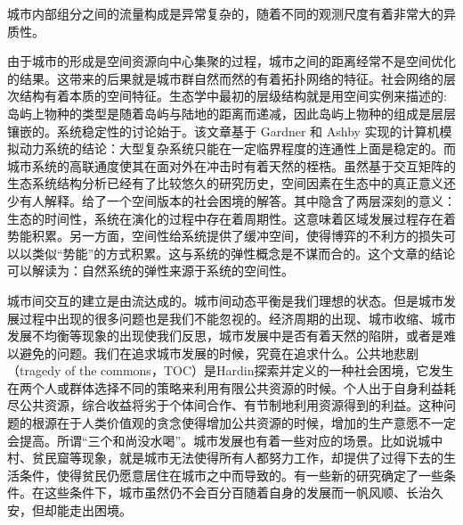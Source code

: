 
城市内部组分之间的流量构成是异常复杂的，随着不同的观测尺度有着非常大的异质性\cite{masucci2013gravity}。


由于城市的形成是空间资源向中心集聚的过程，城市之间的距离经常不是空间优化的结果。这带来的后果就是城市群自然而然的有着拓扑网络的特征。社会网络的层次结构有着本质的空间特征。生态学中最初的层级结构就是用空间实例来描述的:岛屿上物种的类型是随着岛屿与陆地的距离而递减，因此岛屿上物种的组成是层层镶嵌的。系统稳定性的讨论始于\cite{may1972will}。该文章基于 Gardner 和 Ashby 实现的计算机模拟动力系统的结论：大型复杂系统只能在一定临界程度的连通性上面是稳定的。而城市系统的高联通度使其在面对外在冲击时有着天然的桎梏。虽然基于交互矩阵的生态系统结构分析已经有了比较悠久的研究历史，空间因素在生态中的真正意义还少有人解释。\cite{lin2019spatial}给了一个空间版本的社会困境的解答。其中隐含了两层深刻的意义：生态的时间性，系统在演化的过程中存在着周期性。这意味着区域发展过程存在着势能积累。另一方面，空间性给系统提供了缓冲空间，使得博弈的不利方的损失可以以类似“势能”的方式积累。这与系统的弹性\cite{gao2016universal}概念是不谋而合的。这个文章的结论可以解读为：自然系统的弹性来源于系统的空间性。

城市间交互的建立是由流达成的。城市间动态平衡是我们理想的状态。但是城市发展过程中出现的很多问题也是我们不能忽视的。经济周期的出现、城市收缩、城市发展不均衡等现象的出现使我们反思，城市发展中是否有着天然的陷阱，或者是难以避免的问题。我们在追求城市发展的时候，究竟在追求什么。公共地悲剧（tragedy of the commons，TOC）是Hardin\cite{hardin1968tragedy}探索并定义的一种社会困境，它发生在两个人或群体选择不同的策略来利用有限公共资源的时候。个人出于自身利益耗尽公共资源，综合收益将劣于个体间合作、有节制地利用资源得到的利益。这种问题的根源在于人类价值观的贪念使得增加公共资源的时候，增加的生产意愿不一定会提高。所谓“三个和尚没水喝”。城市发展也有着一些对应的场景。比如说城中村、贫民窟等现象，就是城市无法使得所有人都努力工作，却提供了过得下去的生活条件，使得贫民仍愿意居住在城市之中而导致的。有一些新的研究确定了一些条件。在这些条件下，城市虽然仍不会百分百随着自身的发展而一帆风顺、长治久安，但却能走出困境。


